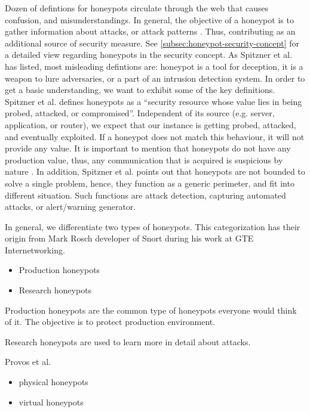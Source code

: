 Dozen of defintions for honeypots circulate through the web that causes confusion, and misunderstandings. In general, the objective of a honeypot is to gather information about attacks, or attack patterns \cite{NawrockiWSKS2016}. Thus, contributing as an additional source of security measure. See \autoref{subsec:honeypot-security-concept} for a detailed view regarding honeypots in the security concept. As Spitzner et al. \cite{Spitzner2003} has listed, most misleading defintions are: honeypot is a tool for deception, it is a weapon to lure adversaries, or a part of an intrusion detection system. In order to get a basic understanding, we want to exhibit some of the key definitions. Spitzner et al. \cite{Spitzner2003} defines honeypots as a \enquote{security resource whose value lies in being probed, attacked, or compromised}. Independent of its source (e.g. server, application, or router), we expect that our instance is getting probed, attacked, and eventually exploited. If a honeypot does not match this behaviour, it will not provide any value. It is important to mention that honeypots do not have any production value, thus, any communication that is acquired is suspicious by nature \cite{Spitzner2003}. In addition, Spitzner et al. points out that honeypots are not bounded to solve a single problem, hence, they function as a generic perimeter, and fit into different situation. Such functions are attack detection, capturing automated attacks, or alert/warning generator.

In general, we differentiate two types of honeypots. This categorization has their origin from Mark Rosch developer of Snort during his work at GTE Internetworking.

\begin{itemize}
    \item Production honeypots
    \item Research honeypots
\end{itemize}

Production honeypots are the common type of honeypots everyone would think of it. The objective is to protect production environment.

Research honeypots are used to learn more in detail about attacks.

Provos et al. \cite{Provos2003} 

\begin{itemize}
    \item physical honeypots
    \item virtual honeypots
\end{itemize}

